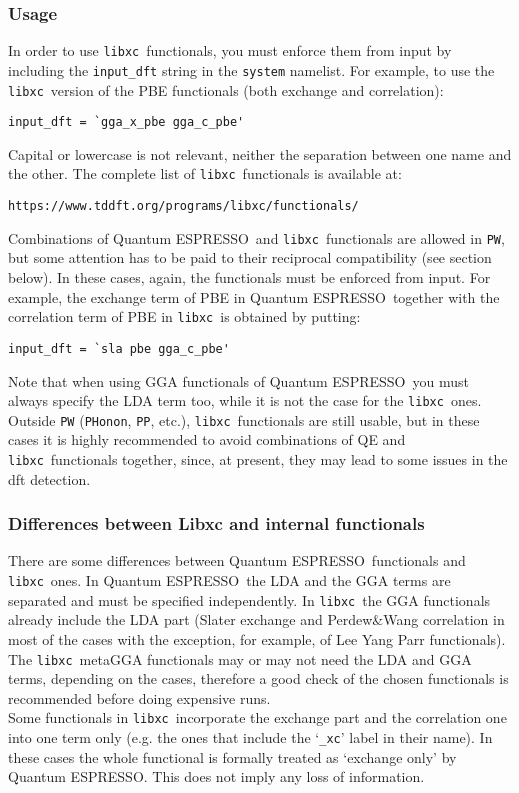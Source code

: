 \documentclass[12pt,a4paper]{article}
\def\qe{{\sc Quantum ESPRESSO}}
\def\libxc{\texttt{libxc}}
\begin{document}
\subsubsection{Usage}
In order to use \libxc\ functionals, you must enforce them from input by including the \texttt{input\_dft} string in the \texttt{system} namelist. For example, to use the \libxc\ version of the PBE functionals (both exchange and correlation):
\begin{verbatim}
input_dft = `gga_x_pbe gga_c_pbe'
\end{verbatim}
%
Capital or lowercase is not relevant, neither the separation between one name and the other. The complete list of \libxc\ functionals is available at:
\begin{verbatim}
https://www.tddft.org/programs/libxc/functionals/
\end{verbatim}
%
Combinations of \qe\ and \libxc\ functionals are allowed in \texttt{PW}, but some attention has to be paid to their reciprocal compatibility (see section below). In these cases, again, the functionals must be enforced from input. For example, the exchange term of PBE in \qe\ together with the correlation term of PBE in \libxc\ is obtained by putting:
\begin{verbatim}
input_dft = `sla pbe gga_c_pbe'
\end{verbatim}
Note that when using GGA functionals of \qe\ you must always specify the LDA term too, while it is not the case for the \libxc\ ones. \\
Outside \texttt{PW} (\texttt{PHonon}, \texttt{PP}, etc.), \libxc\ functionals are still usable, but in these cases it is highly recommended to avoid combinations of QE and \libxc\ functionals together, since, at present, they may lead to some issues in the dft detection.
%
\subsubsection{Differences between Libxc and internal functionals}
There are some differences between \qe\ functionals and \libxc\ ones. In \qe\ the LDA and the GGA terms are separated and must be specified independently. In \libxc\ the GGA functionals already include the LDA part (Slater exchange and Perdew\&Wang correlation in most of the cases with the exception, for example, of Lee Yang Parr functionals).\\
The \libxc\ metaGGA functionals may or may not need the LDA and GGA terms, depending on the cases, therefore a good check of the chosen functionals is recommended before doing expensive runs.\\
Some functionals in \libxc\ incorporate the exchange part and the correlation one into one term only (e.g. the ones that include the `\texttt{\_xc}' label in their name). In these cases the whole functional is formally treated as `exchange only' by \qe. This does not imply any loss of information.
%
\end{document}
